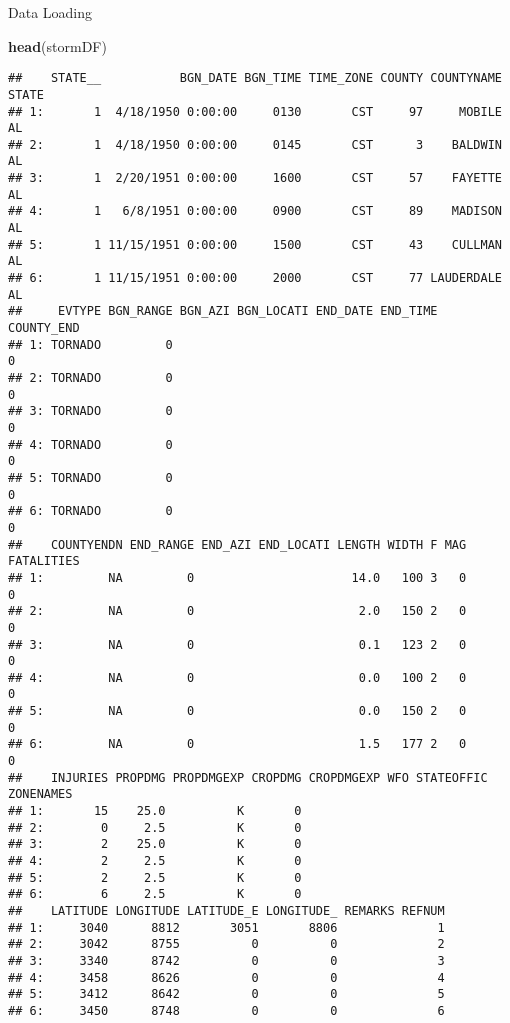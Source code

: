\documentclass[]{article}
\newenvironment{Shaded}{\begin{snugshade}}{\end{snugshade}}
\newcommand{\KeywordTok}[1]{\textcolor[rgb]{0.13,0.29,0.53}{\textbf{#1}}}
\newcommand{\NormalTok}[1]{#1}
\begin{document}
Data Loading

\begin{Shaded}
\begin{Highlighting}[]
\KeywordTok{head}\NormalTok{(stormDF)}
\end{Highlighting}
\end{Shaded}

\begin{verbatim}
##    STATE__           BGN_DATE BGN_TIME TIME_ZONE COUNTY COUNTYNAME STATE
## 1:       1  4/18/1950 0:00:00     0130       CST     97     MOBILE    AL
## 2:       1  4/18/1950 0:00:00     0145       CST      3    BALDWIN    AL
## 3:       1  2/20/1951 0:00:00     1600       CST     57    FAYETTE    AL
## 4:       1   6/8/1951 0:00:00     0900       CST     89    MADISON    AL
## 5:       1 11/15/1951 0:00:00     1500       CST     43    CULLMAN    AL
## 6:       1 11/15/1951 0:00:00     2000       CST     77 LAUDERDALE    AL
##     EVTYPE BGN_RANGE BGN_AZI BGN_LOCATI END_DATE END_TIME COUNTY_END
## 1: TORNADO         0                                               0
## 2: TORNADO         0                                               0
## 3: TORNADO         0                                               0
## 4: TORNADO         0                                               0
## 5: TORNADO         0                                               0
## 6: TORNADO         0                                               0
##    COUNTYENDN END_RANGE END_AZI END_LOCATI LENGTH WIDTH F MAG FATALITIES
## 1:         NA         0                      14.0   100 3   0          0
## 2:         NA         0                       2.0   150 2   0          0
## 3:         NA         0                       0.1   123 2   0          0
## 4:         NA         0                       0.0   100 2   0          0
## 5:         NA         0                       0.0   150 2   0          0
## 6:         NA         0                       1.5   177 2   0          0
##    INJURIES PROPDMG PROPDMGEXP CROPDMG CROPDMGEXP WFO STATEOFFIC ZONENAMES
## 1:       15    25.0          K       0                                    
## 2:        0     2.5          K       0                                    
## 3:        2    25.0          K       0                                    
## 4:        2     2.5          K       0                                    
## 5:        2     2.5          K       0                                    
## 6:        6     2.5          K       0                                    
##    LATITUDE LONGITUDE LATITUDE_E LONGITUDE_ REMARKS REFNUM
## 1:     3040      8812       3051       8806              1
## 2:     3042      8755          0          0              2
## 3:     3340      8742          0          0              3
## 4:     3458      8626          0          0              4
## 5:     3412      8642          0          0              5
## 6:     3450      8748          0          0              6
\end{verbatim}
\end{document}
